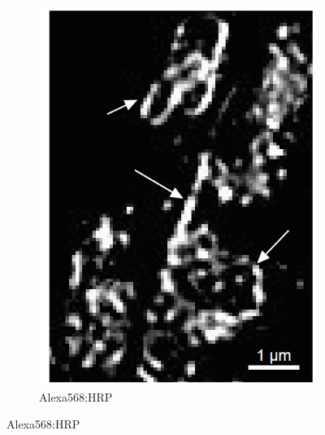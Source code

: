 \begin{figure}
\begin{subfigure}[t]{0.242\textwidth}
		\includegraphics[width=\linewidth]{images/DeepSIM_NMJ_AO_ROI1_Alexa568.jpg}
		\caption{Alexa568:HRP}
		\label{fig:DeepSIM_NMJ_AO_ROI1_Alexa568}
	\end{subfigure}


\end{figure}
